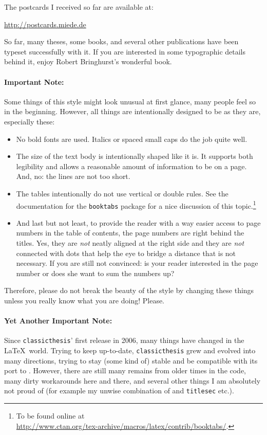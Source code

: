 \noindent The postcards I received so far are available at:
\begin{center}
 \url{http://postcards.miede.de}
\end{center}
 So far, many
theses, some books, and several other publications have been typeset
successfully with it. If you are interested in some typographic
details behind it, enjoy Robert Bringhurst's wonderful
book. %

\paragraph{Important Note:} Some things of this style might look
unusual at first glance, many people feel so in the beginning.
However, all things are intentionally designed to be as they are,
especially these:
\begin{itemize}
\item No bold fonts are used. Italics or spaced small caps do the job
  quite well.
\item The size of the text body is intentionally shaped like it is. It
  supports both legibility and allows a reasonable amount of
  information to be on a page. And, no: the lines are not too short.
\item The tables intentionally do not use vertical or double rules.
  See the documentation for the \texttt{booktabs} package for a nice
  discussion of this topic.\footnote{To be found online at \\
    \url{http://www.ctan.org/tex-archive/macros/latex/contrib/booktabs/}.}
\item And last but not least, to provide the reader with a way easier
  access to page numbers in the table of contents, the page numbers
  are right behind the titles. Yes, they are \emph{not} neatly aligned
  at the right side and they are \emph{not} connected with dots that
  help the eye to bridge a distance that is not necessary. If you are
  still not convinced: is your reader interested in the page number or
  does she want to sum the numbers up?
\end{itemize}

\noindent Therefore, please do not break the beauty of the style by
changing these things unless you really know what you are doing!
Please.

\paragraph{Yet Another Important Note:} Since \texttt{classicthesis}'
first release in 2006, many things have changed in the \LaTeX\ world.
Trying to keep up-to-date, \texttt{classicthesis} grew and evolved
into many directions, trying to stay (some kind of) stable and be
compatible with its port to \mLyX. However, there are still many
remains from older times in the code, many dirty workarounds here and
there, and several other things I am absolutely not proud of (for
example my unwise combination of  and \texttt{titlesec}
etc.). 

